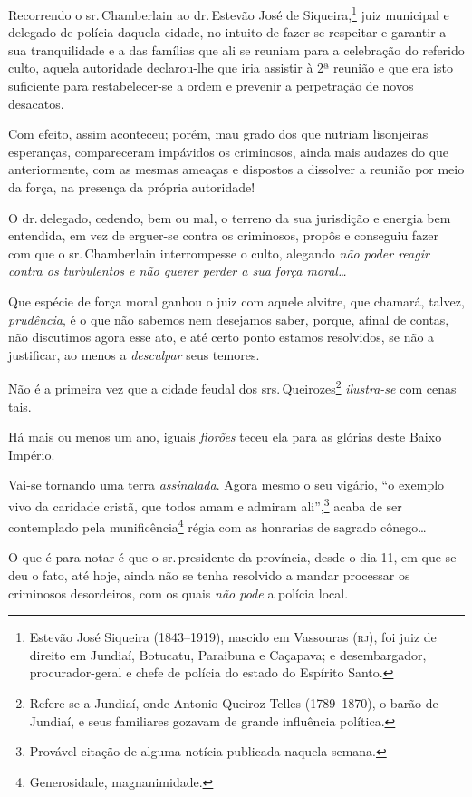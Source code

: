 Recorrendo o sr.\,Chamberlain ao dr.\,Estevão José de Siqueira,\footnote{
  Estevão José Siqueira (1843--1919), nascido em Vassouras (\textsc{rj}), foi juiz
  de direito em Jundiaí, Botucatu, Paraibuna e Caçapava; e
  desembargador, procurador-geral e chefe de polícia do estado do
  Espírito Santo.} juiz municipal e delegado de polícia daquela cidade,
no intuito de fazer-se respeitar e garantir a sua tranquilidade e a das
famílias que ali se reuniam para a celebração do referido culto, aquela
autoridade declarou-lhe que iria assistir à 2ª reunião e que era isto
suficiente para restabelecer-se a ordem e prevenir a perpetração de
novos desacatos.

Com efeito, assim aconteceu; porém, mau grado dos que nutriam
lisonjeiras esperanças, compareceram impávidos os criminosos, ainda mais
audazes do que anteriormente, com as mesmas ameaças e dispostos a
dissolver a reunião por meio da força, na presença da própria
autoridade!

O dr.\,delegado, cedendo, bem ou mal, o terreno da sua jurisdição e
energia bem entendida, em vez de erguer-se contra os criminosos, propôs
e conseguiu fazer com que o sr.\,Chamberlain interrompesse o culto,
alegando \emph{não poder reagir contra os turbulentos e não querer
perder a sua força moral\ldots{}}

Que espécie de força moral ganhou o juiz com aquele alvitre, que
chamará, talvez, \emph{prudência}, é o que não sabemos nem desejamos
saber, porque, afinal de contas, não discutimos agora esse ato, e até
certo ponto estamos resolvidos, se não a justificar, ao menos a
\emph{desculpar} seus temores.

Não é a primeira vez que a cidade feudal dos srs.\,Queirozes\footnote{
  Refere-se a Jundiaí, onde Antonio Queiroz Telles (1789--1870), o barão
  de Jundiaí, e seus familiares gozavam de grande influência política.}
\emph{ilustra-se} com cenas tais.

Há mais ou menos um ano, iguais \emph{florões} teceu ela para as glórias
deste Baixo Império.

Vai-se tornando uma terra \emph{assinalada}. Agora mesmo o seu vigário,
``o exemplo vivo da caridade cristã, que todos amam e admiram
ali'',\footnote{Provável citação de alguma notícia publicada naquela
  semana.} acaba de ser contemplado pela munificência\footnote{
  Generosidade, magnanimidade.} régia com as honrarias de sagrado
cônego\ldots{}

O que é para notar é que o sr.\,presidente da província, desde o dia 11,
em que se deu o fato, até hoje, ainda não se tenha resolvido a mandar
processar os criminosos desordeiros, com os quais \emph{não pode} a
polícia local.

